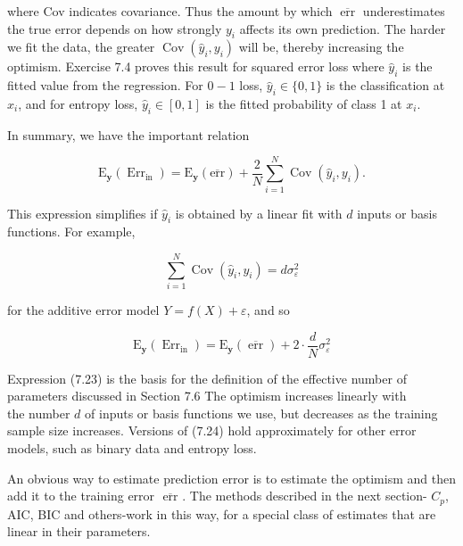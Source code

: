 \documentclass[10pt]{article}
\begin{document}
where Cov indicates covariance. Thus the amount by which $\overline{\operatorname{err}}$ underestimates the true error depends on how strongly $y_{i}$ affects its own prediction. The harder we fit the data, the greater $\operatorname{Cov}\left(\hat{y}_{i}, y_{i}\right)$ will be, thereby increasing the optimism. Exercise 7.4 proves this result for squared error loss where $\hat{y}_{i}$ is the fitted value from the regression. For $0-1$ loss, $\hat{y}_{i} \in\{0,1\}$ is the classification at $x_{i}$, and for entropy loss, $\hat{y}_{i} \in[0,1]$ is the fitted probability of class 1 at $x_{i}$.

In summary, we have the important relation


\begin{equation*}
\mathrm{E}_{\mathbf{y}}\left(\operatorname{Err}_{\mathrm{in}}\right)=\mathrm{E}_{\mathbf{y}}(\overline{\mathrm{err}})+\frac{2}{N} \sum_{i=1}^{N} \operatorname{Cov}\left(\hat{y}_{i}, y_{i}\right) . \tag{7.22}
\end{equation*}


This expression simplifies if $\hat{y}_{i}$ is obtained by a linear fit with $d$ inputs or basis functions. For example,


\begin{equation*}
\sum_{i=1}^{N} \operatorname{Cov}\left(\hat{y}_{i}, y_{i}\right)=d \sigma_{\varepsilon}^{2} \tag{7.23}
\end{equation*}


for the additive error model $Y=f(X)+\varepsilon$, and so


\begin{equation*}
\mathrm{E}_{\mathbf{y}}\left(\operatorname{Err}_{\mathrm{in}}\right)=\mathrm{E}_{\mathbf{y}}(\overline{\operatorname{err}})+2 \cdot \frac{d}{N} \sigma_{\varepsilon}^{2} \tag{7.24}
\end{equation*}


Expression (7.23) is the basis for the definition of the effective number of parameters discussed in Section 7.6 The optimism increases linearly with\\
the number $d$ of inputs or basis functions we use, but decreases as the training sample size increases. Versions of (7.24) hold approximately for other error models, such as binary data and entropy loss.

An obvious way to estimate prediction error is to estimate the optimism and then add it to the training error $\overline{\text { err }}$. The methods described in the next section- $C_{p}$, AIC, BIC and others-work in this way, for a special class of estimates that are linear in their parameters.
\end{document}

